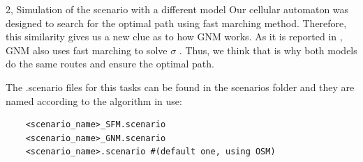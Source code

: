 \begin{task}{2, Simulation of the scenario with a different model}
Our cellular automaton was designed to search for the optimal path using fast marching method. Therefore, this similarity gives us a new clue as to how GNM works. As it is reported in \cite{dietrich2014gradient}, GNM also uses fast marching to solve $\sigma$ \cite{sethian1999level}. Thus, we think that is why both models do the same routes and ensure the optimal path.

The .scenario files for this tasks can be found in the scenarios folder and they are named according to the algorithm in use:
\begin{verbatim}
    <scenario_name>_SFM.scenario
    <scenario_name>_GNM.scenario
    <scenario_name>.scenario #(default one, using OSM)
\end{verbatim}
\end{task}